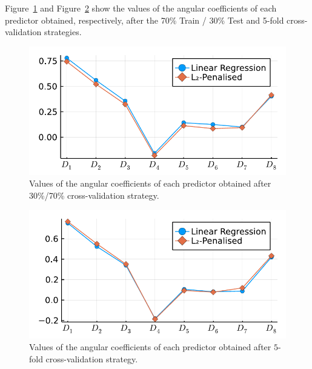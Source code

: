 \documentclass[conference]{IEEEtran}
\begin{document}
Figure~\ref{fig:angular_coefficients_1} and Figure~\ref{fig:angular_coefficients_2} show the values of the angular coefficients of each predictor obtained, respectively, after the 70\% Train / 30\% Test and 5-fold cross-validation strategies.

 





\begin{figure}[h] 
\centerline{\includegraphics[width=\columnwidth]{../figures/fitted_params_70}}
\caption{Values of the angular coefficients of each predictor obtained after 30\%/70\% cross-validation strategy.}
\label{fig:angular_coefficients_1}
\end{figure}

\begin{figure}[h]
\centerline{\includegraphics[width=\columnwidth]{../figures/fitted_params_kfolds}}
\caption{Values of the angular coefficients of each predictor obtained after $5$-fold cross-validation strategy.}
\label{fig:angular_coefficients_2}
\end{figure}
\end{document}
